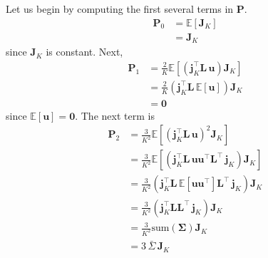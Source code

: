 \documentclass[modern]{aastex62}
\begin{document}
    Let us begin by computing the first several terms in $\mathbf{P}$.
    \begin{align}
        \mathbf{P}_0 & = \mathbb{E}\left[ \mathbf{J}_K \right]
        \nonumber                                              \\
                     & = \mathbf{J}_K
    \end{align}
    since $\mathbf{J}_K$ is constant. Next,
    \begin{align}
        \mathbf{P}_1 & = \frac{2}{K}\mathbb{E}\left[ \left(\mathbf{j}_K^\top \mathbf{L} \, \mathbf{u}\right) \mathbf{J}_K \right]
        \nonumber                                                                                                                 \\
                     & = \frac{2}{K}\left(\mathbf{j}_K^\top \mathbf{L} \, \mathbb{E}\left[ \mathbf{u} \right]\right) \mathbf{J}_K
        \nonumber                                                                                                                 \\
                     & = \mathbf{0}
    \end{align}
    since $\mathbb{E}\left[ \mathbf{u} \right] = \mathbf{0}$. The next term is
    \begin{align}
        \mathbf{P}_2 & = \frac{3}{K^2}\mathbb{E}\left[ \left(\mathbf{j}_K^\top \mathbf{L} \, \mathbf{u}\right)^2 \mathbf{J}_K \right]
        \nonumber                                                                                                                                                                      \\
                     & = \frac{3}{K^2}\mathbb{E}\left[\left(\mathbf{j}_K^\top \mathbf{L} \,  \mathbf{u} \mathbf{u}^\top  \mathbf{L}^\top \, \mathbf{j}_K \right)  \mathbf{J}_K \right]
        \nonumber                                                                                                                                                                      \\
                     & = \frac{3}{K^2}\left(\mathbf{j}_K^\top \mathbf{L} \, \mathbb{E}\left[ \mathbf{u} \mathbf{u}^\top \right] \mathbf{L}^\top \, \mathbf{j}_K \right)  \mathbf{J}_K
        \nonumber                                                                                                                                                                      \\
                     & = \frac{3}{K^2}\left(\mathbf{j}_K^\top \mathbf{L} \mathbf{L}^\top \, \mathbf{j}_K \right)  \mathbf{J}_K
        \nonumber                                                                                                                                                                      \\
                     & = \frac{3}{K^2}\mathrm{sum}(\mathbf{\Sigma}) \mathbf{J}_K
        \nonumber                                                                                                                                                                      \\
                     & = 3 \, \bar{\Sigma} \, \mathbf{J}_K
    \end{align}
\end{document}

